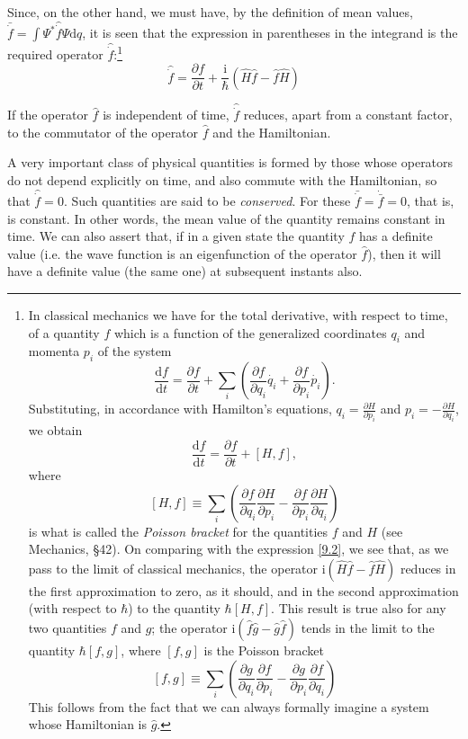 Since, on the other hand, we must have, by the definition of mean values, $ \bar{\dot{f}}=\int\Psi^*\hat{\dot{f}}\Psi\mathrm{d}q $, it is seen that the expression in parentheses in the integrand is the required operator $ \hat{\dot{f}} $:\footnote{In classical mechanics we have for the total derivative, with respect to time, of a quantity $ f $ which is a function of the generalized coordinates $ q_i $ and momenta $ p_i $ of the system
\[ \frac{\mathrm{d}f}{\mathrm{d}t}=\frac{\partial f}{\partial t}+\sum_{i}\left(\frac{\partial f}{\partial q_i}\dot{q_i}+\frac{\partial f}{\partial p_i}\dot{p_i}  \right). \]	
Substituting, in accordance with Hamilton’s equations, $ q_i =\frac{\partial H}{\partial p_i}  $ and $ p_i =-\frac{\partial H}{\partial q_i} $, we obtain
	\[ \frac{\mathrm{d}f}{\mathrm{d}t}=\frac{\partial f}{\partial t}+\left[ H,f\right], \]
where
\[ \left[ H,f\right]\equiv\sum_{i}\left(\frac{\partial f}{\partial q_i}\frac{\partial H}{\partial p_i}-\frac{\partial f}{\partial p_i}\frac{\partial H}{\partial q_i}  \right) \]	
is what is called the \textit{Poisson bracket} for the quantities $ f $ and $ H $ (see Mechanics, §42). On comparing with the expression \eqref{9.2}, we see that, as we pass to the limit of classical mechanics, the operator $ \mathrm{i}(\hat{H}\hat{f}-\hat{f}\hat{H}) $ reduces in the first approximation to zero, as it should, and in the second approximation (with respect to $\hbar$) to the quantity $ \hbar\left[ H,f\right] $. This result is true also for any two quantities $ f $ and $ g $; the operator $ \mathrm{i}(\hat{f}\hat{g}-\hat{g}\hat{f}) $ tends in the limit to the quantity $ \hbar\left[ f,g\right] $, where $ \left[ f,g\right] $ is the Poisson bracket
\[ \left[ f,g\right]\equiv\sum_{i}\left(\frac{\partial g}{\partial q_i}\frac{\partial f}{\partial p_i}-\frac{\partial g}{\partial p_i}\frac{\partial f}{\partial q_i}  \right) \]
This follows from the fact that we can always formally imagine a system whose Hamiltonian is $ \hat{g} $.}
\begin{equation}\label{9.2}
\hat{\dot{f}}=\frac{\partial f}{\partial t}+\frac{\mathrm{i}}{\hbar}(\hat{H}\hat{f}-\hat{f}\hat{H})
\end{equation}

If the operator $ \hat{f} $ is independent of time, $ \hat{\dot{f}} $ reduces, apart from a constant factor, to the commutator of the operator $ \hat{f} $ and the Hamiltonian.

A very important class of physical quantities is formed by those whose operators do not depend explicitly on time, and also commute with the Hamiltonian, so that $ \hat{\dot{f}}=0 $. Such quantities are said to be \textit{conserved}. For these $ \bar{\dot{f}}=\dot{\bar{f}} = 0 $, that is, is constant. In other words, the mean value of the quantity remains constant in time. We can also assert that, if in a given state the quantity $ f $ has a definite value (i.e. the wave function is an eigenfunction of the operator $\hat{f}$), then it will have a definite value (the same one) at subsequent instants also.
